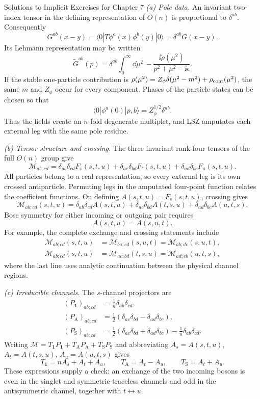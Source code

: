 \begin{bankssolutions}{Solutions to Implicit Exercises for Chapter 7}
\textit{(a) Pole data.}
An invariant two-index tensor in the defining representation of $O(n)$ is
proportional to $\delta^{ab}$.  Consequently
\[
 G^{ab}(x-y)
 =\langle0|T\phi^a(x)\phi^b(y)|0\rangle
 =\delta^{ab}G(x-y).
\]
Its Lehmann representation may be written
\[
 \widetilde G^{ab}(p)=\delta^{ab}
 \int_0^\infty\dd\mu^2\,
 -\frac{\ii\rho(\mu^2)}{p^2+\mu^2-\ii\epsilon}.
\]
If the stable one-particle contribution is
$\rho(\mu^2)=Z_\phi\delta(\mu^2-m^2)+\rho_{\rm cont}(\mu^2)$, the same
$m$ and $Z_\phi$ occur for every component.  Phases of the particle states
can be chosen so that
\[
 \langle0|\phi^a(0)|p,b\rangle=Z_\phi^{1/2}\delta^{ab}.
\]
Thus the fields create an $n$-fold degenerate multiplet, and LSZ amputates
each external leg with the same pole residue.

\textit{(b) Tensor structure and crossing.}
The three invariant rank-four tensors of the full $O(n)$ group give
\[
 \mathcal M_{ab;cd}
 =\delta_{ab}\delta_{cd}F_s(s,t,u)
 +\delta_{ac}\delta_{bd}F_t(s,t,u)
 +\delta_{ad}\delta_{bc}F_u(s,t,u).
\]
All particles belong to a real representation, so every external leg is its
own crossed antiparticle.  Permuting legs in the amputated four-point
function relates the coefficient functions.  On defining
$A(s,t,u)=F_s(s,t,u)$, crossing gives
\begin{equation*}
 \boxed{\mathcal M_{ab;cd}(s,t,u)
 =\delta_{ab}\delta_{cd}A(s,t,u)
 +\delta_{ac}\delta_{bd}A(t,s,u)
 +\delta_{ad}\delta_{bc}A(u,t,s).}
\end{equation*}
Bose symmetry for either incoming or outgoing pair requires
\[
 A(s,t,u)=A(s,u,t).
\]
For example, the complete exchange and crossing statements include
\begin{align*}
 \mathcal M_{ab;cd}(s,t,u)
 &=\mathcal M_{ba;cd}(s,u,t)
 =\mathcal M_{ab;dc}(s,u,t),\\
 \mathcal M_{ab;cd}(s,t,u)
 &=\mathcal M_{ac;bd}(t,s,u)
 =\mathcal M_{ad;cb}(u,t,s),
\end{align*}
where the last line uses analytic continuation between the physical channel
regions.

\textit{(c) Irreducible channels.}
The $s$-channel projectors are
\begin{align*}
 (P_{\mathbf1})_{ab;cd}&=\frac1n\delta_{ab}\delta_{cd},\\
 (P_{\mathrm A})_{ab;cd}
 &=\frac12(\delta_{ac}\delta_{bd}-\delta_{ad}\delta_{bc}),\\
 (P_{\mathrm S})_{ab;cd}
 &=\frac12(\delta_{ac}\delta_{bd}+\delta_{ad}\delta_{bc})
 -\frac1n\delta_{ab}\delta_{cd}.
\end{align*}
Writing
$\mathcal M=T_{\mathbf1}P_{\mathbf1}+T_{\mathrm A}P_{\mathrm A}
+T_{\mathrm S}P_{\mathrm S}$ and abbreviating
$A_s=A(s,t,u)$, $A_t=A(t,s,u)$, $A_u=A(u,t,s)$ gives
\[
 T_{\mathbf1}=nA_s+A_t+A_u,
 \qquad T_{\mathrm A}=A_t-A_u,
 \qquad T_{\mathrm S}=A_t+A_u.
\]
These expressions supply a check: an exchange of the two incoming bosons is
even in the singlet and symmetric-traceless channels and odd in the
antisymmetric channel, together with $t\leftrightarrow u$.


\end{bankssolutions}
